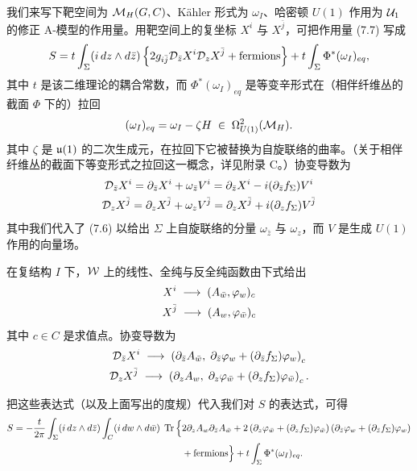 我们来写下靶空间为 $\mathcal{M}_H(G,C)$、Kähler 形式为 $\omega_I$、哈密顿 $U(1)$ 作用为 $\mathcal{U}_1$ 的修正 A-模型的作用量。用靶空间上的复坐标 $X^i$ 与 $X^{\bar j}$，可把作用量 (7.7) 写成
\[
S=t\int_\Sigma(i\,d z\wedge d\bar z)\left\{2g_{i\bar j}\mathcal{D}_{\bar z}X^i\mathcal{D}_zX^{\bar j}+\text{fermions}\right\}+t\int_\Sigma\Phi^*(\omega_I)_{eq},
\]
其中 $t$ 是该二维理论的耦合常数，而 $\Phi^*(\omega_I)_{eq}$ 是等变辛形式在（相伴纤维丛的截面 $\Phi$ 下的）拉回
\[
(\omega_I)_{eq}=\omega_I-\zeta H\;\in\;\Omega^2_{U(1)}(\mathcal{M}_H).
\]
其中 $\zeta$ 是 $\mathfrak{u}(1)$ 的二次生成元，在拉回下它被替换为自旋联络的曲率。（关于相伴纤维丛的截面下等变形式之拉回这一概念，详见附录 C。）协变导数为
\begin{gather}
\mathcal{D}_{\bar z}X^i=\partial_{\bar z}X^i+\omega_{\bar z}V^i=\partial_{\bar z}X^i-i(\partial_{\bar z}f_\Sigma)V^i \notag\\
\mathcal{D}_zX^{\bar j}=\partial_zX^{\bar j}+\omega_zV^{\bar j}=\partial_zX^{\bar j}+i(\partial_zf_\Sigma)V^{\bar j} \notag
\end{gather}
其中我们代入了 (7.6) 以给出 $\Sigma$ 上自旋联络的分量 $\omega_{\bar z}$ 与 $\omega_z$，而 $V$ 是生成 $U(1)$ 作用的向量场。

在复结构 $I$ 下，$\mathcal{W}$ 上的线性、全纯与反全纯函数由下式给出
\begin{gather}
X^i\;\longrightarrow\;(A_{\bar w},\varphi_w)_c \notag\\
X^{\bar j}\;\longrightarrow\;(A_w,\varphi_{\bar w})_c \notag
\end{gather}
其中 $c\in C$ 是求值点。协变导数为
\begin{gather}
\mathcal{D}_{\bar z}X^i\;\longrightarrow\;\left(\partial_{\bar z}A_{\bar w},\;\partial_{\bar z}\varphi_w+(\partial_{\bar z}f_\Sigma)\varphi_w\right)_c \notag\\
\mathcal{D}_zX^{\bar j}\;\longrightarrow\;\left(\partial_zA_w,\;\partial_z\varphi_{\bar w}+(\partial_zf_\Sigma)\varphi_{\bar w}\right)_c . \notag
\end{gather}

把这些表达式（以及上面写出的度规）代入我们对 $S$ 的表达式，可得
\begin{equation*}
\begin{aligned}
S=-\frac{t}{2\pi}\int_\Sigma(i\,d z\wedge d\bar z)\int_C(i\,d w\wedge d\bar w)\;\operatorname{Tr}\Big\{&2\partial_zA_w\partial_{\bar z}A_{\bar w}+2\left(\partial_z\varphi_{\bar w}+(\partial_zf_\Sigma)\varphi_{\bar w}\right)\left(\partial_{\bar z}\varphi_w+(\partial_{\bar z}f_\Sigma)\varphi_w\right)\\
&+\text{fermions}\Big\}+t\int_\Sigma\Phi^*(\omega_I)_{eq}.
\end{aligned}
\end{equation*}

